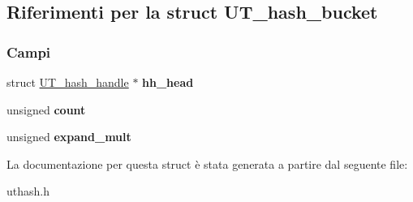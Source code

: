 \hypertarget{structUT__hash__bucket}{}\subsection{Riferimenti per la struct U\+T\+\_\+hash\+\_\+bucket}
\label{structUT__hash__bucket}
\subsubsection*{Campi}
\begin{DoxyCompactItemize}
\item 
\mbox{\label{structUT__hash__bucket_a785a785132212378bb28fb4341cfecaf}} 
struct \mbox{\hyperlink{structUT__hash__handle}{U\+T\+\_\+hash\+\_\+handle}} $\ast$ {\bfseries hh\+\_\+head}
\item 
\mbox{\label{structUT__hash__bucket_a5d20cc12bdcbde360398910eefb45634}} 
unsigned {\bfseries count}
\item 
\mbox{\label{structUT__hash__bucket_a9b739c1b69c141e8198c0c64af643b2b}} 
unsigned {\bfseries expand\+\_\+mult}
\end{DoxyCompactItemize}


La documentazione per questa struct è stata generata a partire dal seguente file\+:\begin{DoxyCompactItemize}
\item 
uthash.\+h\end{DoxyCompactItemize}
